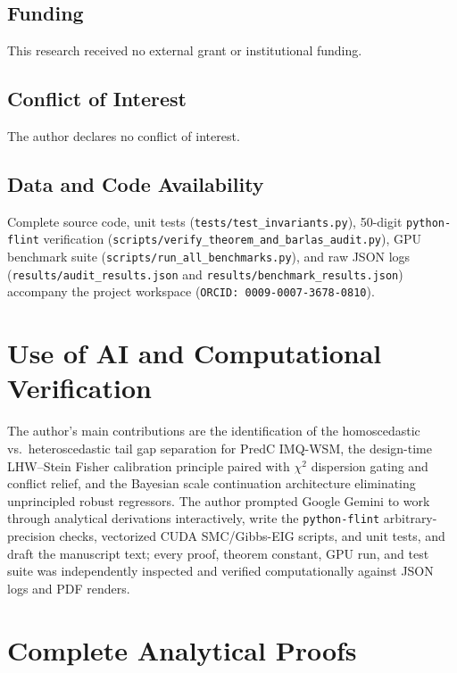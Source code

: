 \documentclass[11pt,a4paper,reqno]{amsart}
\theoremstyle{definition}
\theoremstyle{remark}
\begin{document}
\subsection*{Funding}
This research received no external grant or institutional funding.

\subsection*{Conflict of Interest}
The author declares no conflict of interest.

\subsection*{Data and Code Availability}
Complete source code, unit tests (\nolinkurl{tests/test_invariants.py}), 50-digit \texttt{python-flint} verification (\nolinkurl{scripts/verify_theorem_and_barlas_audit.py}), GPU benchmark suite (\nolinkurl{scripts/run_all_benchmarks.py}), and raw JSON logs (\nolinkurl{results/audit_results.json} and \nolinkurl{results/benchmark_results.json}) accompany the project workspace (\texttt{ORCID: 0009-0007-3678-0810}).

\section*{Use of AI and Computational Verification}
The author's main contributions are the identification of the homoscedastic vs.\ heteroscedastic tail gap separation for PredC IMQ-WSM, the design-time LHW--Stein Fisher calibration principle paired with $\chi^2$ dispersion gating and conflict relief, and the Bayesian scale continuation architecture eliminating unprincipled robust regressors. The author prompted Google Gemini to work through analytical derivations interactively, write the \texttt{python-flint} arbitrary-precision checks, vectorized CUDA SMC/Gibbs-EIG scripts, and unit tests, and draft the manuscript text; every proof, theorem constant, GPU run, and test suite was independently inspected and verified computationally against JSON logs and PDF renders.

\appendix

\section{Complete Analytical Proofs}\label{app:proofs}
\end{document}
